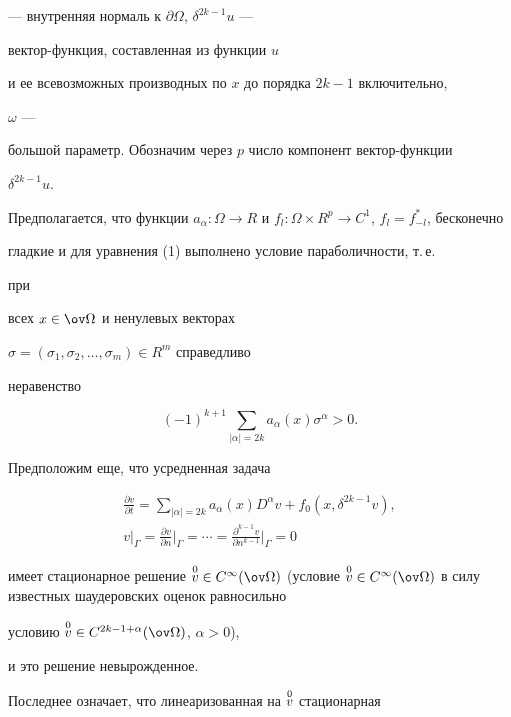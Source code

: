 --- внутренняя нормаль к $\partial\Omega$, $\delta^{2k-1}u$ --- 


вектор-функция, составленная из функции $u$  


и ее всевозможных производных по $x$ до порядка $2k-1$ включительно, 


$\omega$ ---  


большой параметр. Обозначим через $p$ число компонент вектор-функции 


$\delta^{2k-1}u$. 


Предполагается, что функции $a_\alpha:\Omega\to R$ и $f_l:\Omega\times 


R^p\to C^1$, $f_l=f^*_{-l}$, бесконечно  


гладкие и для уравнения (1) выполнено условие параболичности, т.\,е. 


при 


всех $x\in\ov\Omega$ и ненулевых векторах 


$\sigma=(\sigma_1,\sigma_2,\dotsc,\sigma_m)\in R^m$ справедливо  


неравенство 


$$ 


(-1)^{k+1}\sum_{|\alpha|=2k}a_\alpha(x)\sigma^\alpha>0. 


$$ 


Предположим еще, что усредненная задача 


\begin{gather*} 


\frac{\partial v}{\partial t}=\sum_{|\alpha|=2k} 


a_\alpha(x)D^\alpha v+f_0(x,\delta^{2k-1}v), \\ 


v|_{\Gamma}=\frac{\partial v}{\partial n} 


\bigg|_{\Gamma}=\dotsb=\frac{\partial^{k-1}v} 


{\partial n^{k-1}}\bigg|_{\Gamma}=0 


\end{gather*} 


имеет стационарное решение $\up{0}{v}\in 


C^\infty(\ov\Omega)$ (условие $\up{0}{v}\in 


C^\infty(\ov\Omega)$ в силу известных шаудеровских оценок равносильно 


условию $\up{0}{v}\in C^{2k-1+\alpha}(\ov\Omega)$, $\alpha>0$), 


и это решение невырожденное. 


Последнее означает, что линеаризованная на $\overset{0}{v}{}$ стационарная 


